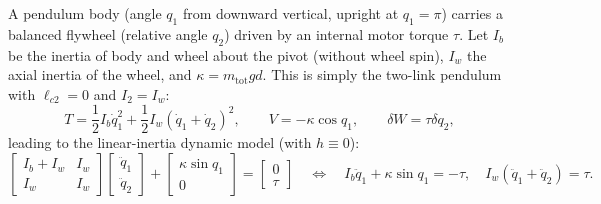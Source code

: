 \documentclass[11pt, a4paper]{article}
\theoremstyle{definition}
\theoremstyle{plain}
\begin{document}
A pendulum body (angle $q_1$ from downward vertical, upright at $q_1 = \pi$) carries a balanced flywheel (relative angle $q_2$) driven by an internal motor torque $\tau$. Let $I_b$ be the inertia of body and wheel about the pivot (without wheel spin), $I_w$ the axial inertia of the wheel, and $\kappa = m_{\text{tot}} g d$. This is simply the two-link pendulum with $\ell_{c2} = 0$ and $I_2 = I_w$:
\[
  T = \frac{1}{2} I_b \dot{q}_1^2 + \frac{1}{2} I_w (\dot{q}_1 + \dot{q}_2)^2, \qquad
  V = -\kappa \cos q_1, \qquad \delta W = \tau \delta q_2,
\]
leading to the linear-inertia dynamic model (with $h \equiv 0$):
\begin{equation}
  \begin{bmatrix} I_b + I_w & I_w \\ I_w & I_w \end{bmatrix}
  \begin{bmatrix} \ddot{q}_1 \\ \ddot{q}_2 \end{bmatrix}
  + \begin{bmatrix} \kappa \sin q_1 \\ 0 \end{bmatrix}
  = \begin{bmatrix} 0 \\ \tau \end{bmatrix}
  \quad\Longleftrightarrow\quad
  I_b \ddot{q}_1 + \kappa \sin q_1 = -\tau, \quad I_w(\ddot{q}_1 + \ddot{q}_2) = \tau.
  \label{eq:rwp}
\end{equation}
\end{document}

